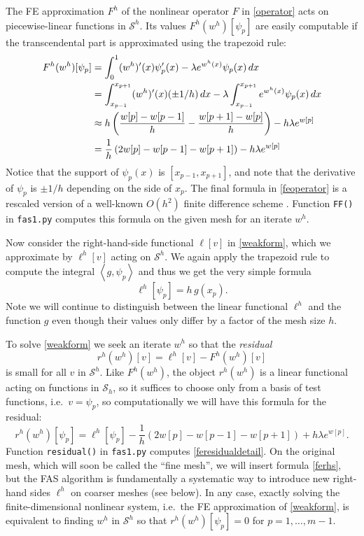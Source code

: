 \documentclass[letterpaper,final,12pt,reqno]{amsart}
\newcommand{\ip}[2]{\left<#1,#2\right>}
\begin{document}
The FE approximation $F^h$ of the nonlinear operator $F$ in \eqref{operator} acts on piecewise-linear functions in $\mathcal{S}^h$.  Its values $F^h(w^h)[\psi_p]$ are easily computable if the transcendental part is approximated using the trapezoid rule:
\begin{align}
  F^h(w^h)[\psi_p] &= \int_0^1 (w^h)'(x) \psi_p'(x) - \lambda e^{w^h(x)} \psi_p(x)\, dx  \label{feoperator} \\
    &= \int_{x_{p-1}}^{x_{p+1}} (w^h)'(x) (\pm 1/h)\,dx - \lambda \int_{x_{p-1}}^{x_{p+1}} e^{w^h(x)} \psi_p(x)\, dx \notag \\
    &\approx h \left(\frac{w[p]-w[p-1]}{h} - \frac{w[p+1]-w[p]}{h}\right) - h \lambda e^{w[p]}  \notag \\
    &= \frac{1}{h}\left(2w[p]-w[p-1]-w[p+1]\right) - h \lambda e^{w[p]} \notag
\end{align}
Notice that the support of $\psi_p(x)$ is $[x_{p-1},x_{p+1}]$, and note that the derivative of $\psi_p$ is $\pm 1/h$ depending on the side of $x_p$.  The final formula in \eqref{feoperator} is a rescaled version of a well-known $O(h^2)$ finite difference scheme \cite[Chapter 3]{Bueler2021}.  Function \texttt{FF()} in \texttt{fas1.py} computes this formula on the given mesh for an iterate $w^h$.

Now consider the right-hand-side functional $\ell[v]$ in \eqref{weakform}, which we approximate by $\ell^h[v]$ acting on $\mathcal{S}^h$.  We again apply the trapezoid rule to compute the integral $\ip{g}{\psi_p}$ and thus we get the very simple formula
\begin{equation}
  \ell^h[\psi_p] = h\, g(x_p). \label{ferhs}
\end{equation}
Note we will continue to distinguish between the linear functional $\ell^h$ and the function $g$ even though their values only differ by a factor of the mesh size $h$.

To solve \eqref{weakform} we seek an iterate $w^h$ so that the \emph{residual}
\begin{equation}
  r^h(w^h)[v] = \ell^h[v] - F^h(w^h)[v]  \label{feresidual}
\end{equation}
is small for all $v$ in $\mathcal{S}^h$.  Like $F^h(w^h)$, the object $r^h(w^h)$ is a linear functional acting on functions in $\mathcal{S}_h$, so it suffices to choose only from a basis of test functions, i.e.~$v=\psi_p$, so computationally we will have this formula for the residual:
\begin{equation}
  r^h(w^h)[\psi_p] = \ell^h[\psi_p] - \frac{1}{h}\left(2w[p]-w[p-1]-w[p+1]\right) + h \lambda e^{w[p]}.  \label{feresidualdetail}
\end{equation}
Function \texttt{residual()} in \texttt{fas1.py} computes \eqref{feresidualdetail}.  On the original mesh, which will soon be called the ``fine mesh'', we will insert formula \eqref{ferhs}, but the FAS algorithm is fundamentally a systematic way to introduce new right-hand sides $\ell^h$ on coarser meshes (see below).  In any case, exactly solving the finite-dimensional nonlinear system, i.e.~the FE approximation of \eqref{weakform}, is equivalent to finding $w^h$ in $\mathcal{S}^h$ so that $r^h(w^h)[\psi_p]=0$ for $p=1,\dots,m-1$.
\end{document}

